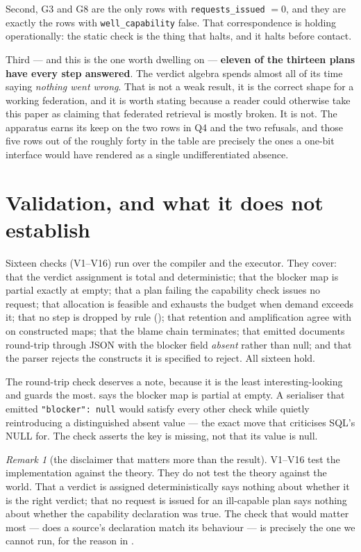 \documentclass[11pt,a4paper]{article}
\theoremstyle{plain}
\theoremstyle{definition}
\theoremstyle{remark}
\newtheorem{remark}[theorem]{Remark}
\newcommand{\vans}{\textsf{answered}}
\newcommand{\vempty}{\textsf{empty}}
\begin{document}
Second, G3 and G8 are the only rows with \texttt{requests\_issued} $=
0$, and they are exactly the rows with \texttt{well\_capability} false.
That correspondence is  holding operationally: the
static check is the thing that halts, and it halts before contact.

Third --- and this is the one worth dwelling on --- \textbf{eleven of
the thirteen plans have every step \vans}. The verdict algebra spends
almost all of its time saying \emph{nothing went wrong}. That is not a
weak result, it is the correct shape for a working federation, and it is
worth stating because a reader could otherwise take this paper as
claiming that federated retrieval is mostly broken. It is not. The
apparatus earns its keep on the two rows in Q4 and the two refusals, and
those five rows out of the roughly forty in the table are precisely the
ones a one-bit interface would have rendered as a single undifferentiated
absence.

\section{Validation, and what it does not establish}
\label{sec:validation}

Sixteen checks (V1--V16) run over the compiler and the executor. They
cover: that the verdict assignment is total and deterministic; that the
blocker map is partial exactly at \vempty; that a plan failing the
capability check issues no request; that allocation is feasible and
exhausts the budget when demand exceeds it; that no step is dropped by
rule (); that retention and amplification agree with
 on constructed maps; that the blame chain terminates;
that emitted documents round-trip through JSON with the blocker field
\emph{absent} rather than null; and that the parser rejects the
constructs it is specified to reject. All sixteen hold.

The round-trip check deserves a note, because it is the least
interesting-looking and guards the most.  says the
blocker map is partial at \vempty. A serialiser that emitted
\texttt{"blocker": null} would satisfy every other check while quietly
reintroducing a distinguished absent value --- the exact move that
 criticises SQL's NULL for. The check asserts the key
is missing, not that its value is null.

\begin{remark}[the disclaimer that matters more than the result]
\label{rem:validation}
V1--V16 test the implementation against the theory. They do not test the
theory against the world. That a verdict is assigned deterministically
says nothing about whether it is the right verdict; that no request is
issued for an ill-capable plan says nothing about whether the capability
declaration was true. The check that would matter most --- does a
source's declaration match its behaviour --- is precisely the one we
cannot run, for the reason in .
\end{remark}
\end{document}
